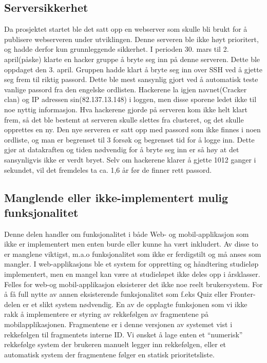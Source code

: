\documentclass[../main.tex]{subfiles}
\begin{document}
\subsection{Serversikkerhet}

Da prosjektet startet ble det satt opp en webserver som skulle bli brukt for å publisere webserveren under utviklingen. Denne serveren ble ikke høyt prioritert, og hadde derfor kun grunnleggende sikkerhet. \newline
I perioden 30. mars til 2. april(påske) klarte en hacker gruppe å bryte seg inn på denne serveren. Dette ble oppdaget den 3. april. Gruppen hadde klart å bryte seg inn over SSH ved å gjette seg frem til riktig passord. Dette ble mest sansynlig gjort ved å automatisk teste vanlige passord fra den engelske ordlisten. Hackerene la igjen navnet(Cracker clan) og IP adressen sin(82.137.13.148) i loggen, men disse sporene ledet ikke til noe nyttig informasjon. \newline
Hva hackerene gjorde på serveren kom ikke helt klart frem, så det ble bestemt at serveren skulle slettes fra clusteret, og det skulle opprettes en ny. \newline
Den nye serveren er satt opp med passord som ikke finnes i noen ordliste, og man er begrenset til 3 forsøk og begrenset tid for å logge inn. Dette gjør at datakraften og tiden nødvendig for å bryte seg inn er så høy at det sansynligvis ikke er verdt bryet. Selv om hackerene klarer å gjette 1012 ganger i sekundet, vil det fremdeles ta ca. 1,6 år før de finner rett passord. 

\subsection{Manglende eller ikke-implementert mulig funksjonalitet}

Denne delen handler om funksjonalitet i både Web- og mobil-applikasjon som ikke er implementert men enten burde eller kunne ha vært inkludert. Av disse to er manglene viktigst, m.a.o funksjonalitet som ikke er ferdigstilt og må anses som mangler. \newline
\newline
I web-applikasjons ble et system for oppretting og håndtering studieløp implementert, men en mangel kan være at studieløpet ikke deles opp i årsklasser. \newline
\newline
Felles for web-og mobil-applikasjon eksisterer det ikke noe reelt brukersystem. For å få full nytte av annen eksisterende funksjonalitet som f.eks Quiz eller Fronter-delen er et slikt system nødvendig.\newline
\newline
En av de opplagte funksjonen som vi ikke rakk å implementere er styring av rekkefølgen av fragmentene på mobilapplikasjonen. Fragmentene er i denne versjonen av systemet vist i rekkefølgen til fragmentets interne ID. Vi ønsket å lage enten et “numerisk” rekkefølge system der brukeren manuelt legger inn rekkefølgen, eller et automatisk system der fragmentene følger en statisk prioritetsliste. 
\end{document}
